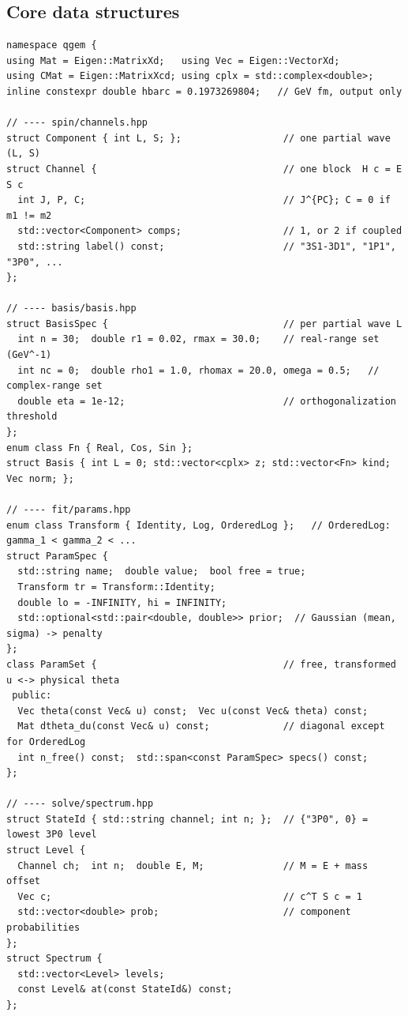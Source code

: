 \documentclass[11pt,a4paper]{article}
\numberwithin{equation}{section}
\theoremstyle{definition}
\theoremstyle{plain}
\theoremstyle{remark}
\numberwithin{algorithm}{section}
\begin{document}
\subsection{Core data structures}\label{sec:bp-types}
\begin{lstlisting}[style=cpp]
namespace qgem {
using Mat = Eigen::MatrixXd;   using Vec = Eigen::VectorXd;
using CMat = Eigen::MatrixXcd; using cplx = std::complex<double>;
inline constexpr double hbarc = 0.1973269804;   // GeV fm, output only

// ---- spin/channels.hpp
struct Component { int L, S; };                  // one partial wave (L, S)
struct Channel {                                 // one block  H c = E S c
  int J, P, C;                                   // J^{PC}; C = 0 if m1 != m2
  std::vector<Component> comps;                  // 1, or 2 if coupled
  std::string label() const;                     // "3S1-3D1", "1P1", "3P0", ...
};

// ---- basis/basis.hpp
struct BasisSpec {                               // per partial wave L
  int n = 30;  double r1 = 0.02, rmax = 30.0;    // real-range set (GeV^-1)
  int nc = 0;  double rho1 = 1.0, rhomax = 20.0, omega = 0.5;   // complex-range set
  double eta = 1e-12;                            // orthogonalization threshold
};
enum class Fn { Real, Cos, Sin };
struct Basis { int L = 0; std::vector<cplx> z; std::vector<Fn> kind; Vec norm; };

// ---- fit/params.hpp
enum class Transform { Identity, Log, OrderedLog };   // OrderedLog: gamma_1 < gamma_2 < ...
struct ParamSpec {
  std::string name;  double value;  bool free = true;
  Transform tr = Transform::Identity;
  double lo = -INFINITY, hi = INFINITY;
  std::optional<std::pair<double, double>> prior;  // Gaussian (mean, sigma) -> penalty
};
class ParamSet {                                 // free, transformed u <-> physical theta
 public:
  Vec theta(const Vec& u) const;  Vec u(const Vec& theta) const;
  Mat dtheta_du(const Vec& u) const;             // diagonal except for OrderedLog
  int n_free() const;  std::span<const ParamSpec> specs() const;
};

// ---- solve/spectrum.hpp
struct StateId { std::string channel; int n; };  // {"3P0", 0} = lowest 3P0 level
struct Level {
  Channel ch;  int n;  double E, M;              // M = E + mass offset
  Vec c;                                         // c^T S c = 1
  std::vector<double> prob;                      // component probabilities
};
struct Spectrum {
  std::vector<Level> levels;
  const Level& at(const StateId&) const;
};


\end{lstlisting}
\end{document}
